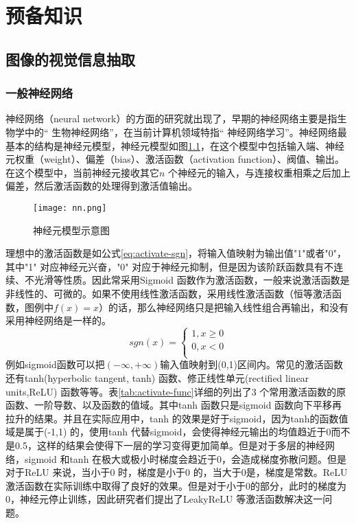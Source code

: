 
\chapter{预备知识}
\label{ch:pre}



\section{图像的视觉信息抽取}


\subsection{一般神经网络}
神经网络（neural network）的方面的研究就出现了，早期的神经网络主要是指生物学中的`` 生物神经网络''，在当前计算机领域特指`` 神经网络学习''。神经网络最基本的结构是神经元模型，神经元模型如图\ref{fig:nn-example}，在这个模型中包括输入端、神经元权重（weight）、偏差（bias）、激活函数（activation function）、阀值、输出。在这个模型中，当前神经元接收其它$n$ 个神经元的输入，与连接权重相乘之后加上偏差，然后激活函数的处理得到激活值输出。
\begin{figure}[htpb]
	\centering
	\texttt{[image: nn.png]}
    \caption{神经元模型示意图}
	\vspace*{-3.5mm}
	\label{fig:nn-example}
\end{figure}
理想中的激活函数是如公式\ref{eq:activate-sgn}，将输入值映射为输出值"1"或者"0"，其中"1" 对应神经元兴奋，"0" 对应于神经元抑制，但是因为该阶跃函数具有不连续、不光滑等性质。因此常采用Sigmoid 函数作为激活函数，一般来说激活函数是非线性的、可微的。如果不使用线性激活函数，采用线性激活函数（恒等激活函数，图例中$f(x) = x$）的话，那么神经网络只是把输入线性组合再输出，和没有采用神经网络是一样的。
\begin{equation}\label{eq:activate-sgn}
    sgn(x)=\left\{
    \begin{aligned}
    1, x\geq 0 \\
    0, x<0 \\
    \end{aligned}
    \right.
\end{equation}
例如sigmoid函数可以把$(-\infty,+\infty)$输入值映射到(0,1)区间内。常见的激活函数还有tanh(hyperbolic tangent, tanh) 函数、修正线性单元(rectified linear units,ReLU) 函数等等。表\ref{tab:activate-func}详细的列出了3 个常用激活函数的原函数、一阶导数、以及函数的值域。其中tanh 函数只是sigmoid 函数向下平移再拉升的结果。并且在实际应用中，tanh 的效果是好于sigmoid，因为tanh的函数值域是属于(-1,1) 的，使用tanh 代替sigmoid，会使得神经元输出的均值趋近于0而不是0.5，这样的结果会使得下一层的学习变得更加简单。但是对于多层的神经网络，sigmoid 和tanh 在极大或极小时梯度会趋近于0，会造成梯度弥散问题。但是对于ReLU 来说，当小于0 时，梯度是小于0 的，当大于0是，梯度是常数。ReLU 激活函数在实际训练中取得了良好的效果。但是对于小于0的部分，此时的梯度为0，神经元停止训练，因此研究者们提出了LeakyReLU 等激活函数解决这一问题。
